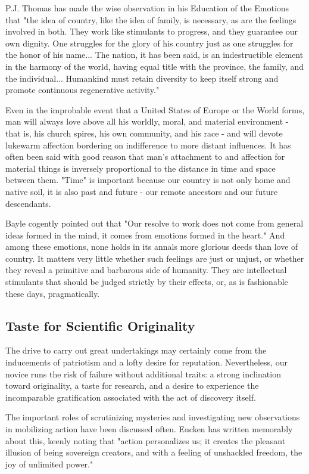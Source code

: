 \documentclass{article}
\begin{document}
P.J. Thomas has made the wise observation in his Education of the Emotions that "the idea of country, like the idea of family, is necessary, as are the feelings involved in both. They work like stimulants to progress, and they guarantee our own dignity. One struggles for the glory of his country just as one struggles for the honor of his name... The nation, it has been said, is an indestructible element in the harmony of the world, having equal title with the province, the family, and the individual... Humankind must retain diversity to keep itself strong and promote continuous regenerative activity."

Even in the improbable event that a United States of Europe or the World forms, man will always love above all his worldly, moral, and material environment - that is, his church spires, his own community, and his race - and will devote lukewarm affection bordering on indifference to more distant influences. It has often been said with good reason that man’s attachment to and affection for material things is inversely proportional to the distance in time and space between them. "Time" is important because our country is not only home and native soil, it is also past and future - our remote ancestors and our future descendants.

Bayle cogently pointed out that "Our resolve to work does not come from general ideas formed in the mind, it comes from emotions formed in the heart." And among these emotions, none holds in its annals more glorious deeds than love of country. It matters very little whether such feelings are just or unjust, or whether they reveal a primitive and barbarous side of humanity. They are intellectual stimulants that should be judged strictly by their effects, or, as is fashionable these days, pragmatically.

\subsection*{Taste for Scientific Originality}

The drive to carry out great undertakings may certainly come from the inducements of patriotism and a lofty desire for reputation. Nevertheless, our novice runs the risk of failure without additional traits: a strong inclination toward originality, a taste for research, and a desire to experience the incomparable gratification associated with the act of discovery itself.

The important roles of scrutinizing mysteries and investigating new observations in mobilizing action have been discussed often. Eucken has written memorably about this, keenly noting that "action personalizes us; it creates the pleasant illusion of being sovereign creators, and with a feeling of unshackled freedom, the joy of unlimited power."
\end{document}
